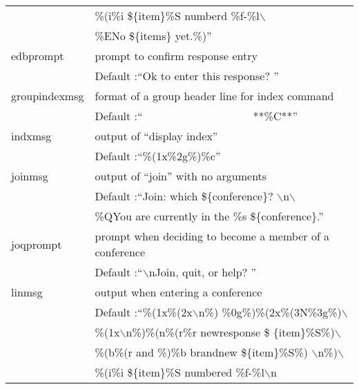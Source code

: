 \documentclass[twoside]{report}
\begin{document}
\begin{supertabular}{ll}
               & \hspace{1cm}\%(i\%i \$\{item\}\%S numberd \%f-\%l$
                 \backslash$ \\
               & \hspace{1cm}\%ENo \$\{items\} yet.\%)''\\
            edbprompt  &   prompt to confirm response entry\\
               & \hspace{1cm} Default :``Ok to enter this response? ''\\
                 groupindexmsg &format of a group header line for index command\\
               & \hspace{1cm} Default :``\ \ \ \ \ \ \ \ \ \ \ \ \ \ \ \ \ \ \ \ **\%C**''\\
            indxmsg &      output of ``display index''\\
               & \hspace{1cm} Default :``\%(1x\%2g\%)\%c''\\
            joinmsg &      output of ``join'' with no arguments\\
               & \hspace{1cm} Default :``Join: which \$\{conference\}?
                 $\backslash$n$\backslash$\\
               & \%QYou are currently in the \%s \$\{conference\}.''\\
            joqprompt &    prompt when deciding to become a member of a 
                           conference\\
               & \hspace{1cm} Default :``$\backslash$nJoin, quit, or help? ''\\
            linmsg  &      output when entering a conference\\
               & \hspace{1cm} Default :``\%(1x\%(2x$\backslash$n\%)
                 \%0g\%)\%(2x\%(3N\%3g\%)$\backslash$\\
               & \hspace{1cm}\%(1x$\backslash$n\%)\%(n\%(r\%r newresponse \$
                 \{item\}\%S\%)$\backslash$\\
               & \hspace{1cm}\%(b\%(r and \%)\%b brandnew \$\{item\}\%S\%)
                 $\backslash$n\%)$\backslash$\\
               & \hspace{1cm}\%(i\%i \$\{item\}\%S numbered \%f-\%l$\backslash$n

\end{supertabular}
\end{document}
